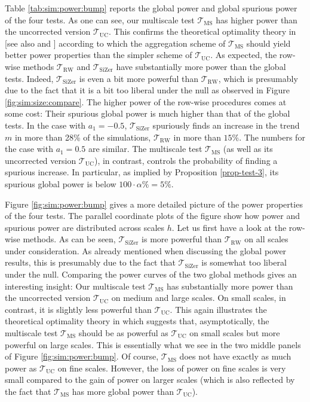Table \ref{tab:sim:power:bump} reports the global power and global spurious power of the four tests. As one can see, our multiscale test $\mathcal{T}_{\text{MS}}$ has higher power than the uncorrected version $\mathcal{T}_{\text{UC}}$. This confirms the theoretical optimality theory in \cite{DuembgenSpokoiny2001} [see also \cite{DuembgenWalther2008} and \cite{RufibachWalther2010}] according to which the aggregation scheme of $\mathcal{T}_{\text{MS}}$ should yield better power properties than the simpler scheme of $\mathcal{T}_{\text{UC}}$. As expected, the row-wise methods $\mathcal{T}_{\text{RW}}$ and $\mathcal{T}_{\text{SiZer}}$ have substantially more power than the global tests. Indeed, $\mathcal{T}_{\text{SiZer}}$ is even a bit more powerful than $\mathcal{T}_{\text{RW}}$, which is presumably due to the fact that it is a bit too liberal under the null as observed in Figure \ref{fig:sim:size:compare}. The higher power of the row-wise procedures comes at some cost: Their spurious global power is much higher than that of the global tests. In the case with $a_1=-0.5$, $\mathcal{T}_{\text{SiZer}}$ spuriously finds an increase in the trend $m$ in more than 28\% of the simulations, $\mathcal{T}_{\text{RW}}$ in more than $15\%$. The numbers for the case with $a_1=0.5$ are similar. The multiscale test $\mathcal{T}_{\text{MS}}$ (as well as its uncorrected version $\mathcal{T}_{\text{UC}}$), in contrast, controls the probability of finding a spurious increase. In particular, as implied by Proposition \ref{prop-test-3}, its spurious global power is below $100\cdot\alpha\% = 5\%$.  


Figure \ref{fig:sim:power:bump} gives a more detailed picture of the power properties of the four tests. The parallel coordinate plots of the figure show how power and spurious power are distributed across scales $h$. Let us first have a look at the row-wise methods. As can be seen, $\mathcal{T}_{\text{SiZer}}$ is more powerful than $\mathcal{T}_{\text{RW}}$ on all scales under consideration. As already mentioned when discussing the global power results, this is presumably due to the fact that $\mathcal{T}_{\text{SiZer}}$ is somewhat too liberal under the null. Comparing the power curves of the two global methods gives an interesting insight: Our multiscale test $\mathcal{T}_{\text{MS}}$ has substantially more power than the uncorrected version $\mathcal{T}_{\text{UC}}$ on medium and large scales. On small scales, in contrast, it is slightly less powerful than $\mathcal{T}_{\text{UC}}$. This again illustrates the theoretical optimality theory in \cite{DuembgenSpokoiny2001} which suggests that, asymptotically, the multiscale test $\mathcal{T}_{\text{MS}}$ should be as powerful as $\mathcal{T}_{\text{UC}}$ on small scales but more powerful on large scales. This is essentially what we see in the two middle panels of Figure \ref{fig:sim:power:bump}. Of course, $\mathcal{T}_{\text{MS}}$ does not have exactly as much power as $\mathcal{T}_{\text{UC}}$ on fine scales. However, the loss of power on fine scales is very small compared to the gain of power on larger scales (which is also reflected by the fact that $\mathcal{T}_{\text{MS}}$ has more global power than $\mathcal{T}_{\text{UC}}$). 


